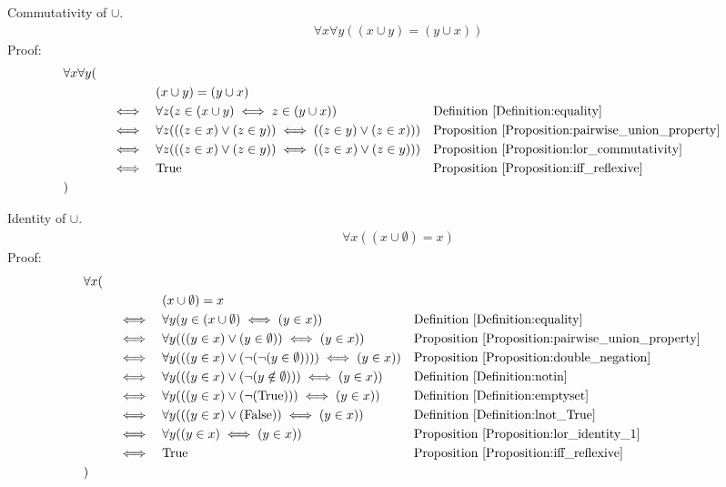 \begin{prop}
\label{Proposition:union_commutativity}
Commutativity of $\cup$.
\begin{align*}
\forall x \forall y ((x \cup y) = (y \cup x))
\end{align*}
Proof:
\begin{align*}
& \forall x \forall y ( \\
& \quad && && (x \cup y) = (y \cup x) \\
& \quad && \iff && \forall z (z \in (x \cup y) \iff z \in (y \cup x))
&& \text{Definition \ref{Definition:equality}} \\
& \quad && \iff && \forall z( ((z \in x) \lor (z \in y)) \iff ((z \in y) \lor (z \in x)) )
&& \text{Proposition \ref{Proposition:pairwise_union_property}} \\
& \quad && \iff && \forall z( ((z \in x) \lor (z \in y)) \iff ((z \in x) \lor (z \in y)) )
&& \text{Proposition \ref{Proposition:lor_commutativity}} \\
& \quad && \iff && \text{True}
&& \text{Proposition \ref{Proposition:iff_reflexive}} \\
& )
\end{align*}
\end{prop}

\begin{prop}
\label{Proposition:union_identity}
Identity of $\cup$.
\begin{align*}
\forall x ((x \cup \emptyset) = x)
\end{align*}
Proof:
\begin{align*}
& \forall x ( \\
& \quad && && (x \cup \emptyset) = x \\
& \quad && \iff && \forall y(y \in (x \cup \emptyset) \iff (y \in x))
&& \text{Definition \ref{Definition:equality}} \\
& \quad && \iff && \forall y(((y \in x) \lor (y \in \emptyset)) \iff (y \in x))
&& \text{Proposition \ref{Proposition:pairwise_union_property}} \\
& \quad && \iff && \forall y(((y \in x) \lor ( \lnot (\lnot (y \in \emptyset))) ) \iff (y \in x))
&& \text{Proposition \ref{Proposition:double_negation}} \\
& \quad && \iff && \forall y(((y \in x) \lor ( \lnot (y \notin \emptyset))) \iff (y \in x))
&& \text{Definition \ref{Definition:notin}} \\
& \quad && \iff && \forall y(((y \in x) \lor ( \lnot (\text{True}))) \iff (y \in x))
&& \text{Definition \ref{Definition:emptyset}} \\
& \quad && \iff && \forall y(((y \in x) \lor (\text{False})) \iff (y \in x))
&& \text{Definition \ref{Definition:lnot_True}} \\
& \quad && \iff && \forall y((y \in x) \iff (y \in x))
&& \text{Proposition \ref{Proposition:lor_identity_1}} \\
& \quad && \iff && \text{True}
&& \text{Proposition \ref{Proposition:iff_reflexive}} \\
& )
\end{align*}
\end{prop}

